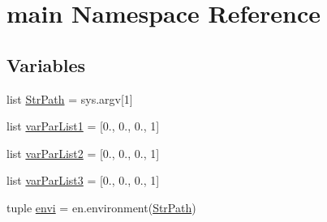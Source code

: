 \hypertarget{namespacemain}{\section{main Namespace Reference}
\label{namespacemain}
}
\subsection*{Variables}
\begin{DoxyCompactItemize}
\item 
list \hyperlink{namespacemain_a8cb6cd8a3bdb1542daaf5064a2b14a2f}{Str\-Path} = sys.\-argv\mbox{[}1\mbox{]}
\item 
list \hyperlink{namespacemain_a153a60cf40f7ed036e2643a50dfbe15a}{var\-Par\-List1} = \mbox{[}0., 0., 0., 1\mbox{]}
\item 
list \hyperlink{namespacemain_a29fdd8f127575fd8ea9e1213c435cbc4}{var\-Par\-List2} = \mbox{[}0., 0., 0., 1\mbox{]}
\item 
list \hyperlink{namespacemain_a807eb3022f203ffcc616a858728f0305}{var\-Par\-List3} = \mbox{[}0., 0., 0., 1\mbox{]}
\item 
tuple \hyperlink{namespacemain_a8d16a33178bd55a2cdb8587ca56fb2b6}{envi} = en.\-environment(\hyperlink{namespacemain_a8cb6cd8a3bdb1542daaf5064a2b14a2f}{Str\-Path})
\end{DoxyCompactItemize}



